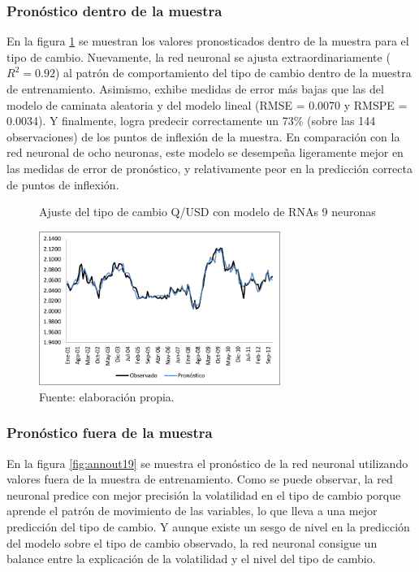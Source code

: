 \subsubsection{Pronóstico dentro de la muestra}
En la figura \ref{fig:annin19} se muestran los valores pronosticados dentro de la muestra para el tipo de cambio. Nuevamente, la red neuronal se ajusta extraordinariamente ($R^2 = 0.92$) al patrón de comportamiento del tipo de cambio dentro de la muestra de entrenamiento. Asimismo, exhibe medidas de error más bajas que las del modelo de caminata aleatoria y del modelo lineal (RMSE = 0.0070 y RMSPE = 0.0034). Y finalmente, logra predecir correctamente un 73\% (sobre las 144 observaciones) de los puntos de inflexión de la muestra. En comparación con la red neuronal de ocho neuronas, este modelo se desempeña ligeramente mejor en las medidas de error de pronóstico, y relativamente peor en la predicción correcta de puntos de inflexión.

\begin{figure}[htb]
	\centering
	\caption{Ajuste del tipo de cambio Q/USD con modelo de RNAs 9 neuronas}
	\label{fig:annin19}
	\includegraphics[width=0.7\textwidth]{figuras/ann19_in.png}
	\caption*{Fuente: elaboración propia.}
\end{figure}


\subsubsection{Pronóstico fuera de la muestra}

En la figura \ref{fig:annout19} se muestra el pronóstico de la red neuronal utilizando valores fuera de la muestra de entrenamiento. Como se puede observar, la red neuronal predice con mejor precisión la volatilidad en el tipo de cambio porque aprende el patrón de movimiento de las variables, lo que lleva a una mejor predicción del tipo de cambio. Y aunque existe un sesgo de nivel en la predicción del modelo sobre el tipo de cambio observado, la red neuronal consigue un balance entre la explicación de la volatilidad y el nivel del tipo de cambio. 


